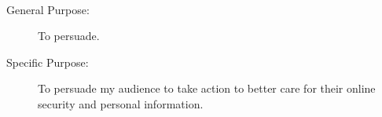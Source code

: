 \documentclass{article}
\begin{document}
  \mbox{}\\[-.2cm]
  \begin{description}
    \item[General Purpose:] To persuade.
    \item[Specific Purpose:] To persuade my audience to take action to better care for their online security and personal information.
  \end{description}
\end{document}
